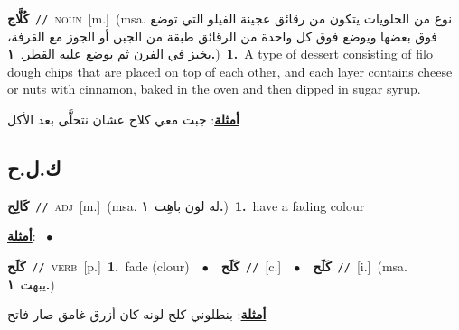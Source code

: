 \documentclass[10pt,a4paper,twoside]{article} %
\begin{document}
\begin{multicols}{2}
{\setlength\topsep{0pt}\textbf{\foreignlanguage{arabic}{كُلَّاج}}\ {\color{gray}\texttt{//}\color{black}}\ \textsc{noun}\ [m.]\ \color{gray}(msa. \foreignlanguage{arabic}{نوع من الحلويات يتكون من رقائق عجينة الفيلو التي توضع فوق بعضها ويوضع فوق كل واحدة من الرقائق طبقة من الجبن أو الجوز مع القرفة، يخبز في الفرن ثم يوضع عليه القطر.}~\foreignlanguage{arabic}{\textbf{١.}})\color{black}\ \textbf{1.}~A type of dessert consisting of filo dough chips that are placed on top of each other, and each layer contains cheese or nuts with cinnamon, baked in the oven and then dipped in sugar syrup.\  \begin{flushright}\color{gray}\foreignlanguage{arabic}{\textbf{\underline{\foreignlanguage{arabic}{أمثلة}}}: جبت معي كلاج عشان نتحلَّى بعد الأكل}\end{flushright}\color{black}} \vspace{2mm}

\vspace{-3mm}
\subsection*{\color{blue}\foreignlanguage{arabic}{ك.ل.ح}\color{blue}{}} 

{\setlength\topsep{0pt}\textbf{\foreignlanguage{arabic}{كَالِح}}\ {\color{gray}\texttt{//}\color{black}}\ \textsc{adj}\ [m.]\ \color{gray}(msa. \foreignlanguage{arabic}{له لون باهِت}~\foreignlanguage{arabic}{\textbf{١.}})\color{black}\ \textbf{1.}~have a fading colour\  \begin{flushright}\color{gray}\foreignlanguage{arabic}{\textbf{\underline{\foreignlanguage{arabic}{أمثلة}}}: \ $\bullet$\ \  }\end{flushright}\color{black}} \vspace{2mm}

{\setlength\topsep{0pt}\textbf{\foreignlanguage{arabic}{كَلَح}}\ {\color{gray}\texttt{//}\color{black}}\ \textsc{verb}\ [p.]\ \textbf{1.}~fade (clour)\ \ $\bullet$\ \ \setlength\topsep{0pt}\textbf{\foreignlanguage{arabic}{كَلَح}}\ {\color{gray}\texttt{//}\color{black}}\ [c.]\ \ $\bullet$\ \ \setlength\topsep{0pt}\textbf{\foreignlanguage{arabic}{كَلَح}}\ {\color{gray}\texttt{//}\color{black}}\ [i.]\ \color{gray}(msa. \foreignlanguage{arabic}{يبهت}~\foreignlanguage{arabic}{\textbf{١.}})\color{black}\  \begin{flushright}\color{gray}\foreignlanguage{arabic}{\textbf{\underline{\foreignlanguage{arabic}{أمثلة}}}: بنطلوني كلح لونه كان أزرق غامق صار فاتح}\end{flushright}\color{black}} \vspace{2mm}


\end{multicols}
\end{document}
